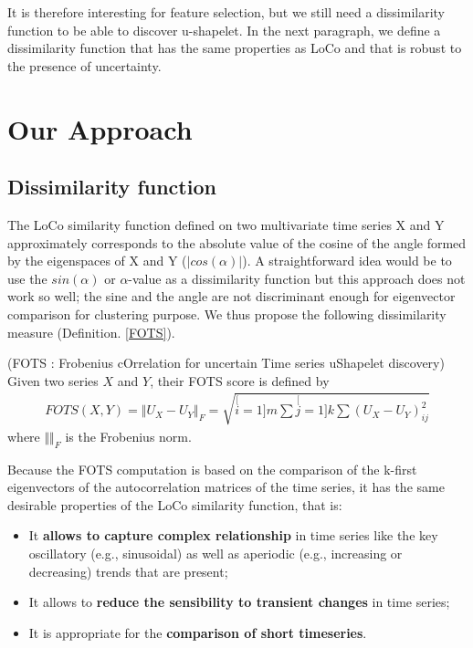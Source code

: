 It is therefore interesting for feature selection, but we still need a dissimilarity
function to be able to discover u-shapelet. In the next paragraph, we 
define a dissimilarity function that has the same properties as LoCo and that is
robust to the presence of uncertainty.

\section{Our Approach}
\subsection{Dissimilarity function}

The LoCo similarity function defined on two multivariate time series X and Y approximately corresponds  to the absolute value of the cosine of the angle formed by the eigenspaces of X and Y ($|cos(\alpha)|$). A straightforward idea would be to use the $sin(\alpha)$ or $\alpha$-value as a dissimilarity function but this approach does not work so well; the sine and the angle are not discriminant enough for eigenvector comparison for clustering purpose. We thus propose the following dissimilarity measure (Definition. \ref{FOTS}). 


\begin{definition}
\label{FOTS}
(FOTS : Frobenius cOrrelation for uncertain Time series uShapelet discovery) Given two series $X$
and $Y$, their FOTS score is defined by
\begin{eqnarray}
FOTS(X,Y)=\Vert U_{X}-U_{Y}\Vert_{F}
=\sqrt{\stackrel[i=1]{m}{\sum}\stackrel[j=1]{k}{\sum}(U_{X}-U_{Y})_{ij}^{2}}
\end{eqnarray}
where $\Vert\Vert_{F}$ is the Frobenius norm.
\end{definition}
 
 Because the FOTS computation is based on the comparison of the k-first eigenvectors of the autocorrelation
 matrices of the time series, it has the same desirable properties of the LoCo
 similarity function, that is: 
 
 \begin{itemize}
   \item It \textbf{allows to capture complex relationship}
in time series like the key oscillatory (e.g., sinusoidal) as well as aperiodic (e.g.,
increasing or decreasing) trends that are present;
   \item It allows to \textbf{reduce the sensibility to transient changes} in time
   series;
   \item It is appropriate for the \textbf{comparison of short
   timeseries}.
 \end{itemize}

